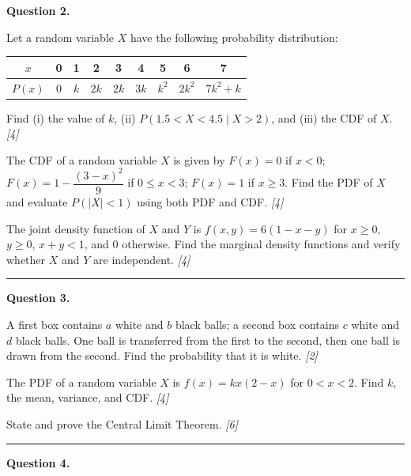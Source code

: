 \documentclass[11pt,a4paper]{article}
\newcommand{\pts}[1]{\hfill   \textit{[#1]}}
\begin{document}
\medskip


\noindent   \textbf{Question 2.}

\begin{parts}
  \item Let a random variable $X$ have the following probability distribution:
  
\begin{center}
  
\begin{tabular}{|c|cccccccc|}
  \hline
  $x$ & 0 & 1 & 2 & 3 & 4 & 5 & 6 & 7 \\\hline
  $P(x)$ & 0 & $k$ & $2k$ & $2k$ & $3k$ & $k^2$ & $2k^2$ & $7k^2+k$ \\\hline
  \end{tabular}
  \end{center}
  Find (i) the value of $k$, (ii) $P(1.5 < X < 4.5 \mid X > 2)$, and (iii) the CDF of $X$. \pts{4}
  \item The CDF of a random variable $X$ is given by $F(x) = 0$ if $x < 0$; $F(x) = 1 - \dfrac{(3-x)^2}{9}$ if $0 \le x < 3$; $F(x) = 1$ if $x \ge 3$. Find the PDF of $X$ and evaluate $P(|X| < 1)$ using both PDF and CDF. \pts{4}
  \item The joint density function of $X$ and $Y$ is $f(x,y) = 6(1-x-y)$ for $x \ge 0$, $y \ge 0$, $x + y < 1$, and $0$ otherwise. Find the marginal density functions and verify whether $X$ and $Y$ are independent. \pts{4}
\end{parts}

\medskip\rule{\linewidth}{0.2pt}

\medskip


\noindent   \textbf{Question 3.}

\begin{parts}
  \item A first box contains $a$ white and $b$ black balls; a second box contains $c$ white and $d$ black balls. One ball is transferred from the first to the second, then one ball is drawn from the second. Find the probability that it is white. \pts{2}
  \item The PDF of a random variable $X$ is $f(x) = kx(2-x)$ for $0 < x < 2$. Find $k$, the mean, variance, and CDF. \pts{4}
  \item State and prove the Central Limit Theorem. \pts{6}
\end{parts}

\medskip\rule{\linewidth}{0.2pt}

\medskip


\noindent   \textbf{Question 4.}
\end{document}
